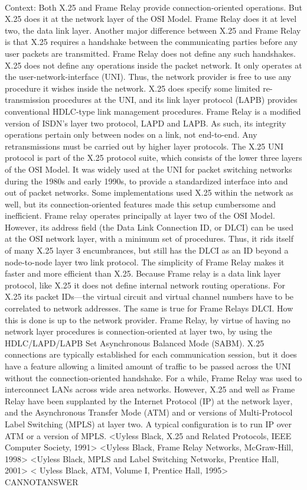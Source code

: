 \documentclass[11pt,a4paper, onecolumn]{article}
\begin{document}
\\ Context: Both X.25 and Frame Relay provide connection-oriented operations. But X.25 does it at the network layer of the OSI Model. Frame Relay does it at level two, the data link layer. Another major difference between X.25 and Frame Relay is that X.25 requires a handshake between the communicating parties before any user packets are transmitted. Frame Relay does not define any such handshakes. X.25 does not define any operations inside the packet network. It only operates at the user-network-interface (UNI). Thus, the network provider is free to use any procedure it wishes inside the network. X.25 does specify some limited re-transmission procedures at the UNI, and its link layer protocol (LAPB) provides conventional HDLC-type link management procedures. Frame Relay is a modified version of ISDN's layer two protocol, LAPD and LAPB. As such, its integrity operations pertain only between nodes on a link, not end-to-end. Any retransmissions must be carried out by higher layer protocols. The X.25 UNI protocol is part of the X.25 protocol suite, which consists of the lower three layers of the OSI Model. It was widely used at the UNI for packet switching networks during the 1980s and early 1990s, to provide a standardized interface into and out of packet networks. Some implementations used X.25 within the network as well, but its connection-oriented features made this setup cumbersome and inefficient. Frame relay operates principally at layer two of the OSI Model. However, its address field (the Data Link Connection ID, or DLCI) can be used at the OSI network layer, with a minimum set of procedures. Thus, it rids itself of many X.25 layer 3 encumbrances, but still has the DLCI as an ID beyond a node-to-node layer two link protocol. The simplicity of Frame Relay makes it faster and more efficient than X.25. Because Frame relay is a data link layer protocol, like X.25 it does not define internal network routing operations. For X.25 its packet IDs---the virtual circuit and virtual channel numbers have to be correlated to network addresses. The same is true for Frame Relays DLCI. How this is done is up to the network provider. Frame Relay, by virtue of having no network layer procedures is connection-oriented at layer two, by using the HDLC/LAPD/LAPB Set Asynchronous Balanced Mode (SABM). X.25 connections are typically established for each communication session, but it does have a feature allowing a limited amount of traffic to be passed across the UNI without the connection-oriented handshake. For a while, Frame Relay was used to interconnect LANs across wide area networks. However, X.25 and well as Frame Relay have been supplanted by the Internet Protocol (IP) at the network layer, and the Asynchronous Transfer Mode (ATM) and or versions of Multi-Protocol Label Switching (MPLS) at layer two. A typical configuration is to run IP over ATM or a version of MPLS. <Uyless Black, X.25 and Related Protocols, IEEE Computer Society, 1991> <Uyless Black, Frame Relay Networks, McGraw-Hill, 1998> <Uyless Black, MPLS and Label Switching Networks, Prentice Hall, 2001> < Uyless Black, ATM, Volume I, Prentice Hall, 1995> CANNOTANSWER
\end{document}
